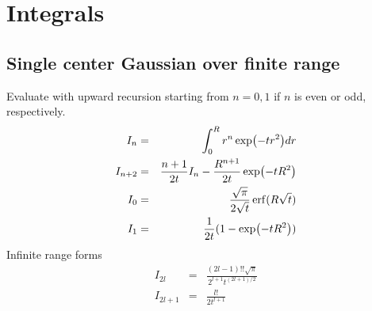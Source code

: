\documentclass[12pt]{article}
\begin{document}
\section{Integrals}

\subsection{Single center Gaussian over finite range}

Evaluate with upward recursion starting from $n=0,1$ if $n$ is even or odd, respectively.
\begin{eqnarray}
  I_n & = & \int_0^R r^n \exp(-tr^2) dr \\
  I_{n+2} & = & \frac{n+1}{2 t} I_n - \frac{R^{n+1}}{2 t} \exp(-t R^2) \\
    I_0 & = & \frac{\sqrt{\pi}}{2\sqrt{t}} \erf(R \sqrt{t}) \\
    I_1 & = & \frac{1}{2t} (1-\exp(-tR^2))
\end{eqnarray}
Infinite range forms
\begin{eqnarray}
  I_{2l} & = & \frac{(2l-1)!! \sqrt{\pi}}{2^{l+1} t^{(2l+1)/2}} \\
  I_{2l+1} & = & \frac{l!}{2 t^{l+1}}  
\end{eqnarray}
\end{document}
